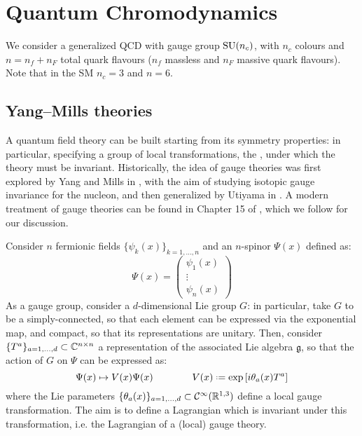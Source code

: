 
\section{Quantum Chromodynamics}
We consider a generalized QCD with gauge group $ \mathrm{SU}(n_c) $, with $ n_c $ colours and $ n = n_f + n_F $ total quark flavours ($ n_f $ massless and $ n_F $ massive quark flavours). Note that in the SM $ n_c = 3 $ and $ n = 6 $.

\subsection{Yang--Mills theories}
\label{ssec:gauge-th}

A quantum field theory can be built starting from its symmetry properties: in particular, specifying a group of local transformations, the , under which the theory must be invariant. Historically, the idea of gauge theories was first explored by Yang and Mills in \cite{Yang-1954}, with the aim of studying isotopic gauge invariance for the nucleon, and then generalized by Utiyama in \cite{Utiyama-1956}. A modern treatment of gauge theories can be found in Chapter 15 of \cite{Peskin-1995}, which we follow for our discussion.

Consider $ n $ fermionic fields $ \{\psi_k(x)\}_{k = 1, \dots, n} $ and an $ n $-spinor $ \Psi(x) $ defined as:
\begin{equation}
  \Psi(x) =
  \begin{pmatrix}
    \psi_1(x) \\ \vdots \\ \psi_n(x)
  \end{pmatrix}
\end{equation}
As a gauge group, consider a $ d $-dimensional Lie group $ G $: in particular, take $ G $ to be a simply-connected, so that each element can be expressed via the exponential map, and compact, so that its representations are unitary. Then, consider $ \{T^a\}_{a = 1, \dots, d} \subset \mathbb{C}^{n \times n} $ a representation of the associated Lie algebra $ \mathfrak{g} $, so that the action of $ G $ on $ \Psi $ can be expressed as:
\begin{equation}
  \Psi(x) \mapsto V(x) \Psi(x)
  \qquad \qquad
  V(x) \defeq \exp \left[ i \theta_a(x) T^a \right]
  \label{eq:gauge-trans}
\end{equation}
where the Lie parameters $ \{\theta_a(x)\}_{a = 1, \dots, d} \subset \mathcal{C}^\infty(\mathbb{R}^{1,3}) $ define a local gauge transformation. The aim is to define a Lagrangian which is invariant under this transformation, i.e. the Lagrangian of a (local) gauge theory.

